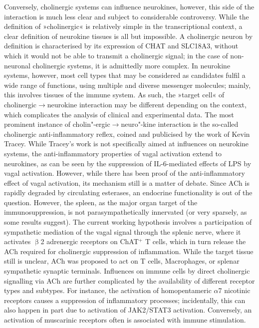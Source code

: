 Conversely, cholinergic systems can influence neurokines, however, this side of the interaction is much less clear and subject to considerable controversy. While the definition of »cholinergic« is relatively simple in the transcriptional context, a clear definition of neurokine tissues is all but impossible. A cholinergic neuron by definition is characterised by its expression of CHAT and SLC18A3, without which it would not be able to transmit a cholinergic signal; in the case of non-neuronal cholinergic systems, it is admittedly more complex. In neurokine systems, however, most cell types that may be considered as candidates fulfil a wide range of functions, using multiple and diverse messenger molecules; mainly, this involves tissues of the immune system. As such, the »target cell« of cholinergic$\to$neurokine interaction may be different depending on the context, which complicates the analysis of clinical and experimental data. The most prominent instance of cholin"-ergic$\to$neuro"-kine interaction is the so-called cholinergic anti-inflammatory reflex, coined and publicised by the work of Kevin Tracey.\cite{Tracey2002} While Tracey's work is not specifically aimed at influences on neurokine systems, the anti-inflammatory properties of vagal activation extend to neurokines, as can be seen by the suppression of IL-6-mediated effects of LPS by vagal activation.\cite{Garcia-Oscos2015} However, while there has been proof of the anti-inflammatory effect of vagal activation, its mechanism still is a matter of debate. Since ACh is rapidly degraded by circulating esterases, an endocrine functionality is out of the question. However, the spleen, as the major organ target of the immunosuppression, is not parasympathetically innervated (or very sparsely, as some results suggest).\cite{} The current working hypothesis involves a participation of sympathetic mediation of the vagal signal through the splenic nerve, where it activates $\upbeta$2 adrenergic receptors on ChAT$^+$ T cells, which in turn release the ACh required for cholinergic suppression of inflammation. While the target tissue still is unclear, ACh was proposed to act on T cells, Macrophages, or splenar sympathetic synaptic terminals.\cite{Zila2017} Influences on immune cells by direct cholinergic signalling via ACh are further complicated by the availability of different receptor types and subtypes. For instance, the activation of homopentameric $\alpha$7 nicotinic receptors causes a suppression of inflammatory processes; incidentally, this can also happen in part due to activation of JAK2/STAT3 activation.\cite{Cui2010} Conversely, an activation of muscarinic receptors often is associated with immune stimulation.\cite{Razani-Boroujerdi2008}

